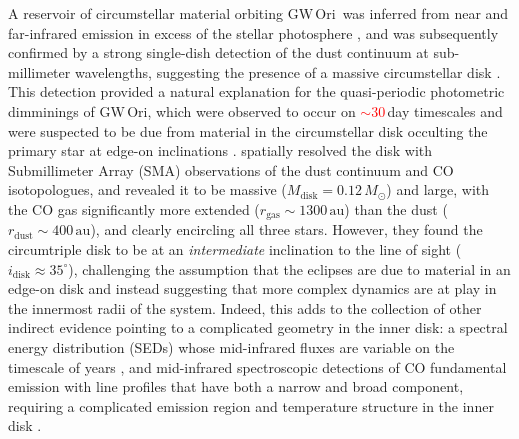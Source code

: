 \documentclass[twocolumn]{aastex61}
\newcommand{\todo}[1]{ \textcolor{red}{#1}}
\newcommand{\obj}{GW\,Ori}
\begin{document}
A reservoir of circumstellar material orbiting \obj\ was inferred from near and far-infrared emission in excess of the stellar photosphere \citep{mathieu91}, and was subsequently confirmed by a strong single-dish detection of the dust continuum at sub-millimeter wavelengths, suggesting the presence of a massive circumstellar disk \citep[$M_\mathrm{disk} \gtrsim 0.1\,M_\odot$;][]{mathieu95}. This detection provided a natural explanation for the  quasi-periodic photometric dimminings of \obj, which were observed to occur on \todo{$\sim$30\,}day timescales and were suspected to be due from material in the circumstellar disk occulting the primary star at edge-on inclinations \citep[$i_\mathrm{disk} \approx 90^\circ$;][]{shevchenko92,shevchenko98}.
\citet{fang17} spatially resolved the disk with Submillimeter Array (SMA) observations of the dust continuum and CO isotopologues, and revealed it to be massive ($M_\mathrm{disk} = 0.12\,M_\odot$) and large, with the CO gas significantly more extended ($r_\mathrm{gas} \sim 1300\,\mathrm{au}$) than the dust ($r_\mathrm{dust} \sim 400\,\mathrm{au}$), and clearly encircling all three stars. However, they found the circumtriple disk to be at an \emph{intermediate} inclination to the line of sight ($i_\mathrm{disk} \approx 35^\circ$), challenging the assumption that the eclipses are due to material in an edge-on disk and instead suggesting that more complex dynamics are at play in the innermost radii of the system.
Indeed, this adds to the collection of other indirect evidence pointing to a complicated geometry in the inner disk: a spectral energy distribution (SEDs) whose mid-infrared fluxes are variable on the timescale of years \citep{fang14}, and mid-infrared spectroscopic detections of CO fundamental emission with line profiles that have both a narrow and broad component, requiring a complicated emission region and temperature structure in the inner disk \citep{najita03}.
\end{document}
